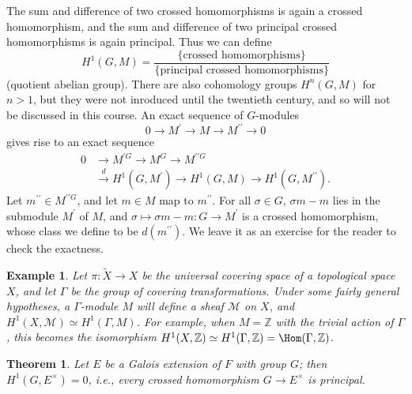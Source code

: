 \documentclass[a4paper,11pt,final,openany]{memoir}
\newtheorem{theorem}[X]{Theorem}
\newtheorem{example}[X]{Example}
\theoremstyle{nonumberplain}
\begin{document}
The sum and difference of two crossed homomorphisms is again a crossed
homomorphism, and the sum and difference of two principal crossed
homomorphisms is again principal. Thus we can define
\[
H^{1}(G,M)=\frac{\{\text{crossed homomorphisms}\}}{\{\text{principal crossed
homomorphisms}\}}%
\]
(quotient abelian group). There are also cohomology groups%
$H^{n}(G,M)$ for $n>1$, but they were not inroduced until the twentieth
century, and so will not be discussed in this course. An exact sequence of
$G$-modules%
\[
0\rightarrow M^{\prime}\rightarrow M\rightarrow M^{\prime\prime}\rightarrow0
\]
gives rise to an exact sequence%
\begin{align*}
0&\longrightarrow M^{\prime G}\longrightarrow M^{G}\longrightarrow
M^{\prime\prime G}\\
&\overset{d}{\longrightarrow}H^{1}(G,M^{\prime}%
)\longrightarrow H^{1}(G,M)\longrightarrow H^{1}(G,M^{\prime\prime}).
\end{align*}
Let $m^{\prime\prime}\in M^{\prime\prime G}$, and let $m\in M$ map to
$m^{\prime\prime}$. For all $\sigma\in G$, $\sigma m-m$ lies in the submodule
$M^{\prime}$ of $M$, and $\sigma\mapsto\sigma m-m\colon G\rightarrow
M^{\prime}$ is a crossed homomorphism, whose class we define to be
$d(m^{\prime\prime})$. We leave it as an exercise for the reader to check the exactness.

\begin{example}
\label{ag17}Let $\pi\colon\tilde{X}\rightarrow X$ be the universal covering
space of a topological space $X$, and let $\Gamma$ be the group of covering
transformations. Under some fairly general hypotheses, a $\Gamma$-module $M$
will define a sheaf $\mathcal{M}$ on $X$, and $H^{1}(X,\mathcal{M})\simeq
H^{1}(\Gamma,M)$. For example, when $M=\mathbb{Z}$ with the trivial action of
$\Gamma$, this becomes the isomorphism $H^{1}(X,\mathbb{Z})\simeq H^{1}%
(\Gamma,\mathbb{Z})=\Hom(\Gamma,\mathbb{Z})$.
\end{example}

\begin{theorem}
\label{ag18}Let $E$ be a Galois extension of $F$ with group $G$; then
$H^{1}(G,E^{\times})=0$, i.e., every crossed homomorphism $G\rightarrow
E^{\times}$ is principal.
\end{theorem}
\end{document}
